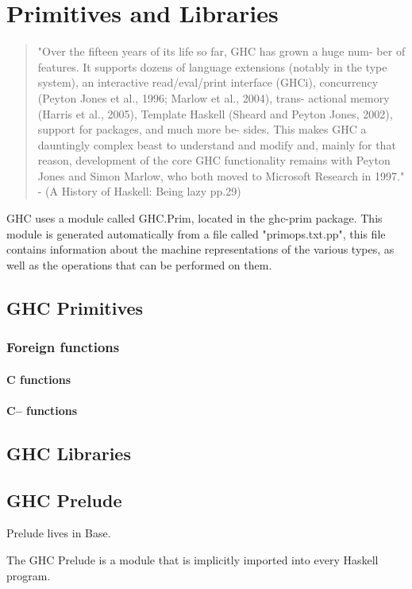 

\chapter{Primitives and Libraries}


\begin{quotation}
"Over the fifteen years of its life so far, GHC has grown a huge num-
ber of features. It supports dozens of language extensions (notably
in the type system), an interactive read/eval/print interface (GHCi),
concurrency (Peyton Jones et al., 1996; Marlow et al., 2004), trans-
actional memory (Harris et al., 2005), Template Haskell (Sheard
and Peyton Jones, 2002), support for packages, and much more be-
sides. This makes GHC a dauntingly complex beast to understand
and modify and, mainly for that reason, development of the core
GHC functionality remains with Peyton Jones and Simon Marlow,
who both moved to Microsoft Research in 1997." - (A History of Haskell: Being lazy pp.29)
\end{quotation}


GHC uses a module called GHC.Prim, located in the ghc-prim package. This
module is generated automatically from a file called "primops.txt.pp", this file
contains information about the machine representations of the various types, as
well as the operations that can be performed on them.

\section{GHC Primitives}

\subsection{Foreign functions}

\subsubsection{C functions}

\subsubsection{C-- functions}

\section{GHC Libraries}



\section{GHC Prelude}

Prelude lives in Base.

The GHC Prelude is a module that is implicitly imported into every Haskell program.

